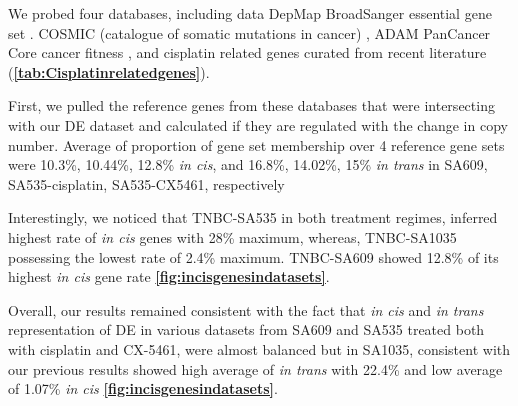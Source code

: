 We probed four databases, including data DepMap BroadSanger essential gene set \cite{dempster2019agreement}. COSMIC (catalogue of somatic mutations in cancer) \cite{forbes2010cosmic}, ADAM PanCancer Core cancer fitness  \cite{behan2019prioritization}, and cisplatin related genes curated from recent literature (\textbf{\autoref{tab:Cisplatinrelatedgenes}}).

First, we pulled the reference genes from these databases that were intersecting with our \ac{DE} dataset and calculated if they are regulated with the change in copy number.
Average of proportion of gene set membership over 4 reference gene sets were 10.3\%, 10.44\%, 12.8\% \textit{in cis}, and 16.8\%, 14.02\%, 15\% \textit{in trans} in SA609, SA535-cisplatin, SA535-CX5461, respectively 

Interestingly, we noticed that TNBC-SA535 in both treatment regimes, inferred highest rate of \textit{in cis} genes with 28\% maximum, whereas, TNBC-SA1035 possessing the lowest rate of 2.4\% maximum. TNBC-SA609 showed 12.8\% of its highest \textit{in cis} gene rate \textbf{\autoref{fig:incisgenesindatasets}}.

 Overall, our results remained consistent with the fact that \textit{in cis} and \textit{in trans} representation of DE in various datasets from SA609 and SA535 treated both with cisplatin and CX-5461, were almost balanced but in SA1035, consistent with our previous results showed high average of \textit{in trans} with 22.4\%  and low average of 1.07\% \textit{in cis} \textbf{\autoref{fig:incisgenesindatasets}}.



 
